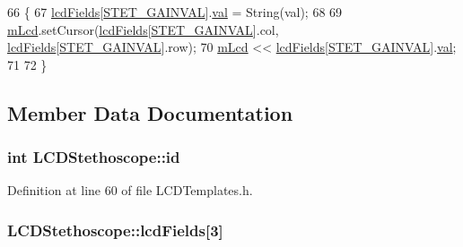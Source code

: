 \begin{DoxyCode}
66                                           \{
67     \hyperlink{class_l_c_d_stethoscope_ad36003e685beee5f2268fd4ef1f0db8c}{lcdFields}[\hyperlink{_l_c_d_templates_8h_a99df264a27c8c425105db42a1dbc5fbb}{STET\_GAINVAL}].\hyperlink{struct_l_c_d_template_field_a6eb7ce0547fc28ac3a2538f0fac3f117}{val} = String(val);
68   
69     \hyperlink{class_l_c_d_stethoscope_af91304920f29b700ae27aee8aba23ac1}{mLcd}.setCursor(\hyperlink{class_l_c_d_stethoscope_ad36003e685beee5f2268fd4ef1f0db8c}{lcdFields}[\hyperlink{_l_c_d_templates_8h_a99df264a27c8c425105db42a1dbc5fbb}{STET\_GAINVAL}].col, 
      \hyperlink{class_l_c_d_stethoscope_ad36003e685beee5f2268fd4ef1f0db8c}{lcdFields}[\hyperlink{_l_c_d_templates_8h_a99df264a27c8c425105db42a1dbc5fbb}{STET\_GAINVAL}].row);
70     \hyperlink{class_l_c_d_stethoscope_af91304920f29b700ae27aee8aba23ac1}{mLcd} << \hyperlink{class_l_c_d_stethoscope_ad36003e685beee5f2268fd4ef1f0db8c}{lcdFields}[\hyperlink{_l_c_d_templates_8h_a99df264a27c8c425105db42a1dbc5fbb}{STET\_GAINVAL}].\hyperlink{struct_l_c_d_template_field_a6eb7ce0547fc28ac3a2538f0fac3f117}{val};
71   
72 \}
\end{DoxyCode}


\subsection{Member Data Documentation}
\hypertarget{class_l_c_d_stethoscope_a865d5b5da67eb0841c34b1a436ef28ba}{
\subsubsection[{id}]{\setlength{\rightskip}{0pt plus 5cm}int L\-C\-D\-Stethoscope\-::id}}\label{class_l_c_d_stethoscope_a865d5b5da67eb0841c34b1a436ef28ba}


Definition at line 60 of file L\-C\-D\-Templates.\-h.

\hypertarget{class_l_c_d_stethoscope_ad36003e685beee5f2268fd4ef1f0db8c}{
\subsubsection[{lcd\-Fields}]{ L\-C\-D\-Stethoscope\-::lcd\-Fields\mbox{[}3\mbox{]}}}\label{class_l_c_d_stethoscope_ad36003e685beee5f2268fd4ef1f0db8c}


